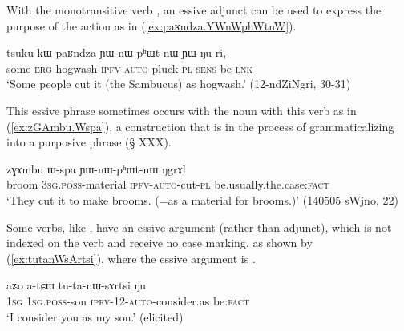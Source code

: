 With the monotransitive verb , an essive adjunct can be used to express the purpose of the action as in (\ref{ex:paʁndza.YWnWphWtnW}).  

\begin{exe}
\ex \label{ex:paʁndza.YWnWphWtnW} 
\gll tsuku kɯ paʁndza ɲɯ-nɯ-pʰɯt-nɯ ɲɯ-ŋu ri,  \\
some \textsc{erg} hogwash \textsc{ipfv}-\textsc{auto}-pluck-\textsc{pl} \textsc{sens}-be \textsc{lnk}   \\
\glt `Some people cut it (the Sambucus) as hogwash.' (12-ndZiNgri, 30-31)
\end{exe}

This essive phrase sometimes occurs with the noun  with this verb as in (\ref{ex:zGAmbu.Wspa}), a construction that is in the process of grammaticalizing into a purposive phrase (§ XXX).  
 
\begin{exe}
\ex \label{ex:zGAmbu.Wspa}
\gll  zɣɤmbu ɯ-spa ɲɯ-nɯ-pʰɯt-nɯ ŋgrɤl  \\
broom \textsc{3sg.poss}-material \textsc{ipfv-auto}-cut-\textsc{pl} be.usually.the.case:\textsc{fact} \\
\glt `They cut it to make brooms. (=as a material for brooms.)' (140505 sWjno, 22)
\end{exe}

Some verbs, like , have an essive argument (rather than adjunct), which is not indexed on the verb and receive no case marking, as shown by  (\ref{ex:tutanWsArtsi}), where the essive argument is .

\begin{exe}
\ex \label{ex:tutanWsArtsi}
 \gll aʑo a-tɕɯ tu-ta-nɯ-sɤrtsi ŋu \\
 \textsc{1sg} \textsc{1sg}.\textsc{poss}-son \textsc{ipfv}-1\fl{}2-\textsc{auto}-consider.as be:\textsc{fact} \\
 \glt `I consider you as my son.' (elicited)
\end{exe}


